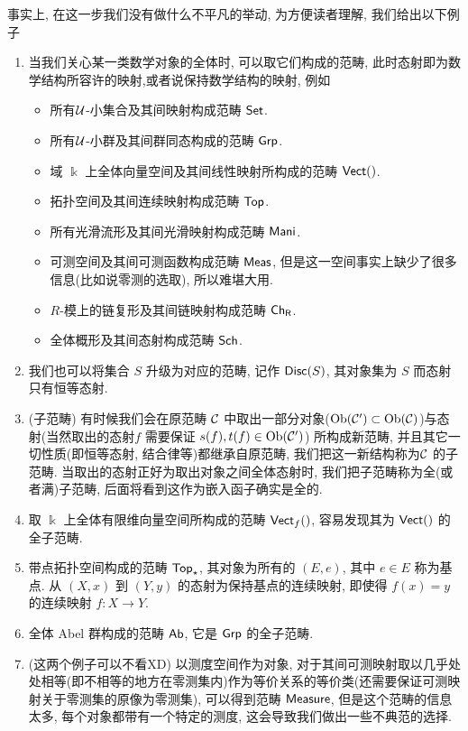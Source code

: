 事实上, 在这一步我们没有做什么不平凡的举动, 为方便读者理解, 我们给出以下例子
\begin{example}\label{例:范畴}
    \begin{enumerate}
        \item 当我们关心某一类数学对象的全体时, 可以取它们构成的范畴, 此时态射即为数学结构所容许的映射,或者说保持数学结构的映射, 例如
        \begin{itemize}
            \item 所有$\cal{U}$-小集合及其间映射构成范畴 $\mathsf{Set}$.
            \item 所有$\cal{U}$-小群及其间群同态构成的范畴 $\mathsf{Grp}$.
            \item 域 $\Bbbk$ 上全体向量空间及其间线性映射所构成的范畴 $\mathsf{Vect}({\relax})$.
            \item 拓扑空间及其间连续映射构成范畴 $\mathsf{Top}$.
            \item 所有光滑流形及其间光滑映射构成范畴 $\mathsf{Mani}$.
            \item 可测空间及其间可测函数构成范畴 $\mathsf{Meas}$, 但是这一空间事实上缺少了很多信息(比如说零测的选取), 所以难堪大用.
            \item $R$-模上的链复形及其间链映射构成范畴 $\mathsf{\mathsf{Ch}_R}$.
            \item 全体概形及其间态射构成范畴 $\mathsf{Sch}$.
        \end{itemize}
        \item 我们也可以将集合 $S$ 升级为对应的范畴, 记作 $\mathsf{Disc}(S)$, 其对象集为 $S$ 而态射只有恒等态射.
        \item(子范畴) 有时候我们会在原范畴 $\cal{C}$ 中取出一部分对象($\operatorname{Ob}(\cal{C}')\subset \operatorname{Ob}(\cal{C})$)与态射(当然取出的态射$f$ 需要保证 $s(f), t(f) \in \operatorname{Ob}(\cal{C}')$) 所构成新范畴, 并且其它一切性质(即恒等态射, 结合律等)都继承自原范畴, 我们把这一新结构称为$\cal{C}$ 的子范畴. 当取出的态射正好为取出对象之间全体态射时, 我们把子范畴称为全(或者满)子范畴, 后面将看到这作为嵌入函子确实是全的.
        \item 取 $\Bbbk$ 上全体有限维向量空间所构成的范畴 $\mathsf{Vect}_{f}(\relax)$, 容易发现其为 $\mathsf{Vect}(\relax)$ 的全子范畴.
        \item 带点拓扑空间构成的范畴 $\mathsf{Top}_{\star}$, 其对象为所有的 $(E,e)$, 其中 $e \in E$ 称为基点. 从 $(X,x)$ 到 $(Y,y)$ 的态射为保持基点的连续映射, 即使得 $f(x) = y$ 的连续映射 $f:X \to Y$.
        \item 全体 Abel 群构成的范畴 $\mathsf{Ab}$, 它是 $\mathsf{Grp}$ 的全子范畴.
        \item(这两个例子可以不看XD) 以测度空间作为对象, 对于其间可测映射取以几乎处处相等(即不相等的地方在零测集内)作为等价关系的等价类(还需要保证可测映射关于零测集的原像为零测集), 可以得到范畴 $\mathsf{Measure}$, 但是这个范畴的信息太多, 每个对象都带有一个特定的测度, 这会导致我们做出一些不典范的选择.

\end{enumerate}
\end{example}

